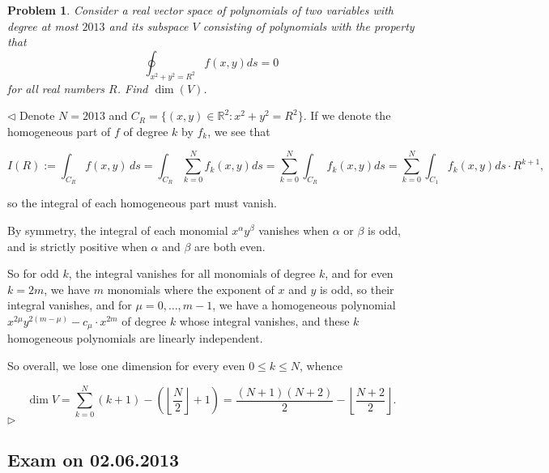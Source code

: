 \documentclass[12pt]{article}
\newtheorem{problem}{Problem}[subsection]
\newenvironment{solution}{\par $\triangleleft$}{$\triangleright$}
\begin{document}
\begin{problem} Consider a real vector space of polynomials of two variables
with degree at most $2013$ and its subspace $V$ consisting of polynomials with
the property that
$$
    \oint_{x^2+y^2=R^2}f(x,y)ds=0
$$
for all real numbers $R$. Find $\dim(V)$.
\end{problem}
\begin{solution} Denote $N=2013$ and $C_R=\{(x,y)\in\mathbb{R}^2:
        x^2+y^2=R^2\}$. If we denote the homogeneous part of $f$ of degree $k$
    by $f_k$, we see that

    $$
        I(R)
        :=\int_{C_R} f(x,y)\,ds
        =\int_{C_R} \sum_{k=0}^N f_k(x,y) ds
        =\sum_{k=0}^N \int_{C_R} f_k(x,y) ds
        =\sum_{k=0}^N \int_{C_1}f_k(x,y) ds\cdot R^{k+1},
    $$

    so the integral of each homogeneous part must vanish.

    By symmetry, the integral of each monomial $x^\alpha y^\beta$ vanishes when
    $\alpha$ or $\beta$ is odd, and is strictly positive when $\alpha$ and
    $\beta$ are both even.

    So for odd $k$, the integral vanishes for all monomials of degree $k$, and
    for even $k = 2m$, we have $m$ monomials where the exponent of $x$ and $y$
    is odd, so their integral vanishes, and for $\mu = 0,\dotsc,m-1$, we have a
    homogeneous polynomial $x^{2\mu}y^{2(m-\mu)} - c_\mu\cdot x^{2m}$ of degree
    $k$ whose integral vanishes, and these $k$ homogeneous polynomials are
    linearly independent.

    So overall, we lose one dimension for every even $0 \leq k \leq N$, whence

    $$\dim V = \sum_{k=0}^N (k+1) - \left(\left\lfloor \frac{N}{2}\right\rfloor
        + 1\right) = \frac{(N+1)(N+2)}{2} - \left\lfloor
        \frac{N+2}{2}\right\rfloor.$$
\end{solution}













\newpage

\subsection{Exam on 02.06.2013}
\end{document}
